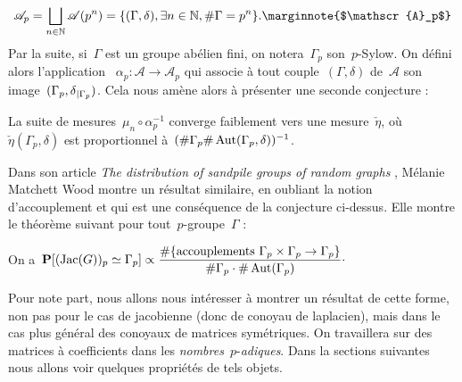 	\[
		\mathscr{A}_p = \bigsqcup_{n\in\mathbb{N}} \mathscr{A}(p^n)
			= \{(\Gamma,\delta), \exists n\in\mathbb{N},\#\Gamma = p^n\}.
			\text{\marginnote{$\mathscr{A}_p$}}
	\]
	Par la suite, si~$\Gamma$ est un groupe abélien fini, on notera~$\Gamma_p$ son~$p$-Sylow. On défini alors l'application ~$\alpha_p : \mathscr{A} \rightarrow\mathscr{A}_p$ qui associe à tout couple~$(\Gamma,\delta)$ de~$\mathscr{A}$ son image~$(\Gamma_p,\delta{}_{|\Gamma_p})$. Cela nous amène alors à présenter une seconde conjecture :
	\begin{conj}
		La suite de mesures~$\mu_n\circ\alpha_p^{-1}$ converge faiblement vers une mesure~$\check{\eta}$, où~$\check{\eta}(\Gamma_p,\delta)$ est proportionnel à~$(\#\Gamma_p\#\operatorname{Aut}(\Gamma_p,\delta))^{-1}$.
	\end{conj}
	Dans son article \emph{The distribution of sandpile groups of random graphs} \cite{main},  Mélanie Matchett Wood montre un résultat similaire, en oubliant la notion d'accouplement et qui est une conséquence de la conjecture ci-dessus. Elle montre le théorème suivant pour tout~$p$-groupe~$\Gamma$ :
	\begin{thm}
		On a~$\displaystyle \bm{\mathrm{P}}[(\operatorname{Jac}(G))_p\simeq \Gamma_p] \propto \frac{\#\{\text{accouplements }\Gamma_p\times \Gamma_p\rightarrow \Gamma_p\}}{\#\Gamma_p \cdot \#\operatorname{Aut}(\Gamma_p)} \cdot$
	\end{thm}	
	Pour note part, nous allons nous intéresser à montrer un résultat de cette forme, non pas pour le cas de jacobienne (donc de conoyau de laplacien), mais dans le cas plus général des conoyaux de matrices symétriques. On travaillera sur des matrices à coefficients dans les \emph{nombres}~$p$-\emph{adiques}. Dans la sections suivantes nous allons voir quelques propriétés de tels objets.
	